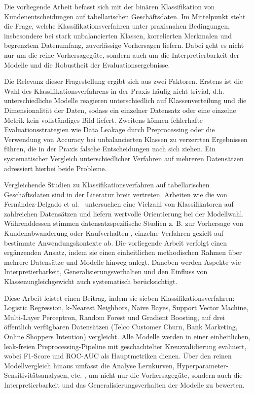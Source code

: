 \documentclass[10pt]{scrartcl}
\begin{document}
Die vorliegende Arbeit befasst sich mit der binären Klassifikation von Kundenentscheidungen auf tabellarischen Geschäftsdaten. Im Mittelpunkt steht die Frage, welche Klassifikationsverfahren unter praxisnahen Bedingungen, insbesondere bei stark unbalancierten Klassen, korrelierten Merkmalen und begrenztem Datenumfang, zuverlässige Vorhersagen liefern. Dabei geht es nicht nur um die reine Vorhersagegüte, 
sondern auch um die Interpretierbarkeit der Modelle und die Robustheit der Evaluationsergebnisse.

Die Relevanz dieser Fragestellung ergibt sich aus zwei Faktoren. Erstens ist die Wahl des Klassifikationsverfahrens in der Praxis häufig nicht trivial, d.h. unterschiedliche Modelle reagieren unterschiedlich auf Klassenverteilung und die Dimensionalität der Daten, sodass ein einzelner Datensatz oder eine einzelne Metrik kein vollständiges Bild liefert. Zweitens können fehlerhafte Evaluationsstrategien 
wie Data Leakage durch Preprocessing oder die Verwendung von Accuracy bei unbalancierten Klassen zu verzerrten Ergebnissen führen, die in der Praxis falsche Entscheidungen nach sich ziehen. Ein systematischer Vergleich unterschiedlicher Verfahren auf mehreren Datensätzen adressiert hierbei beide Probleme.

Vergleichende Studien zu Klassifikationsverfahren auf tabellarischen Geschäftsdaten sind in der Literatur breit vertreten. Arbeiten wie die von Fernández-Delgado et al.\ \cite{FernandezDelgado2014} untersuchen eine Vielzahl von Klassifikatoren auf zahlreichen Datensätzen und liefern wertvolle Orientierung bei der Modellwahl. Währenddessen stimmen datensatzspezifische Studien z. B. zur Vorhersage von Kundenabwanderung \cite{Ahmad2019}
oder Kaufverhalten \cite{Sakar2019}, einzelne Verfahren gezielt auf bestimmte Anwendungskontexte ab. Die vorliegende Arbeit verfolgt einen ergänzenden Ansatz, indem sie einen einheitlichen methodischen Rahmen über mehrere Datensätze und Modelle hinweg anlegt. Daneben werden Aspekte wie Interpretierbarkeit, Generalisierungsverhalten und den Einfluss von Klassenungleichgewicht auch systematisch berücksichtigt.

Diese Arbeit leistet einen Beitrag, indem sie sieben Klassifikationsverfahren: Logistic Regression, k-Nearest Neighbors, Naive Bayes, Support Vector Machine, Multi-Layer Perceptron, Random Forest und Gradient Boosting, auf drei öffentlich verfügbaren Datensätzen (Telco Customer Churn, Bank Marketing, Online Shoppers Intention) vergleicht. Alle Modelle werden in einer einheitlichen, leak-freien Preprocessing-Pipeline 
mit geschachtelter Kreuzvalidierung evaluiert, wobei F1-Score und ROC-AUC als Hauptmetriken dienen. Über den reinen Modellvergleich hinaus umfasst die Analyse Lernkurven, Hyperparameter-Sensitivitätsanalysen, etc. , um nicht nur die Vorhersagegüte, sondern auch die Interpretierbarkeit und das Generalisierungsverhalten der Modelle zu bewerten.
\end{document}
